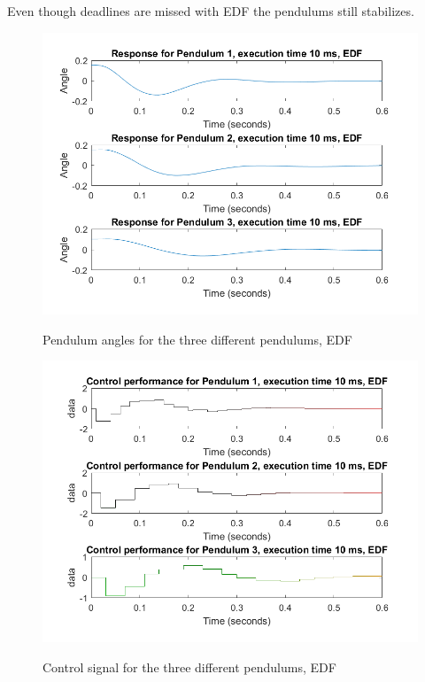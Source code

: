 \documentclass[12pt,a4paper]{article}
\begin{document}
\subsection{}
Even though deadlines are missed with EDF the pendulums still stabilizes. 
\begin{center}
	\begin{figure}[H]
      \centering
	\includegraphics[scale=0.5]{ex6531.png}
	\label{fig:ex61}
	\caption{Pendulum angles for the three different pendulums, EDF}
	\end{figure}
\end{center}
\begin{center}
	\begin{figure}[H]
      \centering
	\includegraphics[scale=0.5]{ex6532.png}
	\label{fig:ex62}
	\caption{Control signal  for the three different pendulums, EDF}
	\end{figure}
\end{center}
\end{document}
